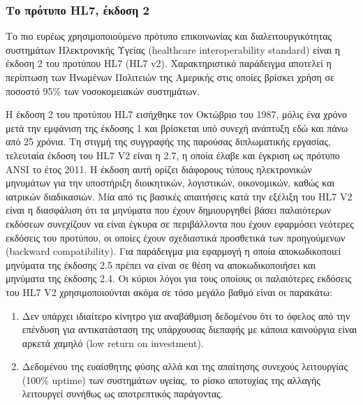 		\subsubsection{Το πρότυπο HL7, έκδοση 2}
		Το πιο ευρέως χρησιμοποιούμενο πρότυπο επικοινωνίας και διαλειτουργικότητας συστημάτων Ηλεκτρονικής Υγείας (healthcare interoperability standard) είναι η έκδοση 2 του προτύπου HL7 (HL7 v2). Χαρακτηριστικό παράδειγμα αποτελεί η περίπτωση των Ηνωμένων Πολιτειών της Αμερικής στις οποίες βρίσκει χρήση σε ποσοστό 95\% των νοσοκομειακών συστημάτων\cite{benson2012principles}.
		
		Η έκδοση 2 του προτύπου HL7 εισήχθηκε τον Οκτώβριο του 1987, μόλις ένα χρόνο μετά την εμφάνιση της έκδοσης 1 και βρίσκεται υπό συνεχή ανάπτυξη εδώ και πάνω από 25 χρόνια. Τη στιγμή της συγγραφής της παρούσας διπλωματικής εργασίας, τελευταία έκδοση του HL7 V2 είναι η 2.7, η οποία έλαβε και έγκριση ως πρότυπο ANSI το έτος 2011\cite{HL7Version27}. Η έκδοση αυτή ορίζει διάφορους τύπους ηλεκτρονικών μηνυμάτων για την υποστήριξη διοικητικών, λογιστικών, οικονομικών, καθώς και ιατρικών διαδικασιών. Μία από τις βασικές απαιτήσεις κατά την εξέλιξη του HL7 V2 είναι η διασφάλιση ότι τα μηνύματα που έχουν δημιουργηθεί βάσει παλαιότερων εκδόσεων συνεχίζουν να είναι έγκυρα σε περιβάλλοντα που έχουν εφαρμόσει νεότερες εκδόσεις του προτύπου, οι οποίες έχουν σχεδιαστικά προσθετικά των προηγούμενων (backward compatibility). Για παράδειγμα μια εφαρμογή η οποία αποκωδικοποιεί μηνύματα της έκδοσης 2.5 πρέπει να είναι σε θέση να αποκωδικοποιήσει και μηνύματα της έκδοσης 2.4. Οι κύριοι λόγοι για τους οποίους οι παλαιότερες εκδόσεις του HL7 V2 χρησιμοποιούνται ακόμα σε τόσο μεγάλο βαθμό είναι οι παρακάτω:
		\begin{enumerate}
			\item Δεν υπάρχει ιδιαίτερο κίνητρο για αναβάθμιση δεδομένου ότι το όφελος από την επένδυση για αντικατάσταση της υπάρχουσας διεπαφής με κάποια καινούργια είναι αρκετά χαμηλό (low return on investment).
			\item Δεδομένου της ευαίσθητης φύσης αλλά και της απαίτησης συνεχούς λειτουργίας (100\% uptime) των συστημάτων υγείας, το ρίσκο αποτυχίας της αλλαγής λειτουργεί συνήθως ως αποτρεπτικός παράγοντας.
		\end{enumerate}		 
		

